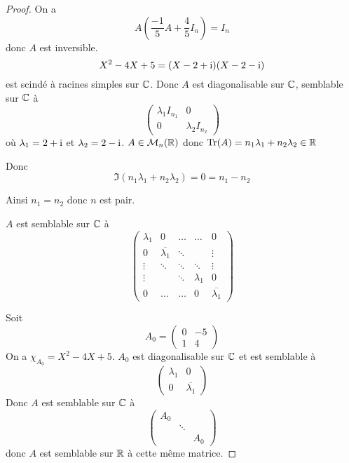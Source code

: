\documentclass[12pt]{article}
\begin{document}
\begin{proof}
	On a 
	\begin{equation}
		A\left(\frac{-1}{5}A+\frac{4}{5}I_{n}\right)=I_{n}
	\end{equation}
	donc $A$ est inversible.
	\begin{equation}
		X^{2}-4X+5=(X-2+\mathrm{i})(X-2-\mathrm{i})
	\end{equation}
	est scindé à racines simples sur $\mathbb{C}$. Donc $A$ est diagonalisable sur $\mathbb{C}$, semblable sur $\mathbb{C}$ à
	\begin{equation}
		\begin{pmatrix}
			\lambda_{1}I_{n_{1}} &0\\
			0 & \lambda_{2}I_{n_{2}}
		\end{pmatrix}
	\end{equation}
	où $\lambda_{1}=2+\mathrm{i}$ et $\lambda_{2}=2-\mathrm{i}$. $A\in\mathcal{M}_{n}(\mathbb{R})$ donc $\operatorname{Tr}(A)=n_{1}\lambda_{1}+n_{2}\lambda_{2}\in\mathbb{R}$

	Donc 
	\begin{equation}
		\Im(n_{1}\lambda_{1}+n_{2}\lambda_{2})=0=n_{1}-n_{2}
	\end{equation}

	Ainsi $n_{1}=n_{2}$ donc $n$ est pair.

	$A$ est semblable sur $\mathbb{C}$ à 
	\begin{equation}
		\begin{pmatrix}
			\lambda_{1}&0&\dots&\dots&0\\
			0&\overline{\lambda_{1}}&\ddots&&\vdots\\
			\vdots &\ddots & \ddots &\ddots&\vdots\\
			\vdots & &\ddots & \lambda_{1}&0\\
			0 &\dots&\dots&0&\overline{\lambda_{1}}
		\end{pmatrix}
	\end{equation}

	Soit 
	\begin{equation}
		A_{0}=
		\begin{pmatrix}
			0&-5\\
			1&4
		\end{pmatrix}
	\end{equation}
	On a $\chi_{A_{0}}=X^{2}-4X+5$. $A_{0}$ est diagonalisable sur $\mathbb{C}$ et est semblable à 
	\begin{equation}
		\begin{pmatrix}
			\lambda_{1}&0\\
			0&\overline{\lambda_{1}}
		\end{pmatrix}
	\end{equation}
	Donc $A$ est semblable sur $\mathbb{C}$ à 
	\begin{equation}
		\begin{pmatrix}
			A_{0}&&\\
			&\ddots&\\
			&&A_{0}
		\end{pmatrix}
	\end{equation}
	donc $A$ est semblable sur $\mathbb{R}$ à cette même matrice.


\end{proof}
\end{document}
